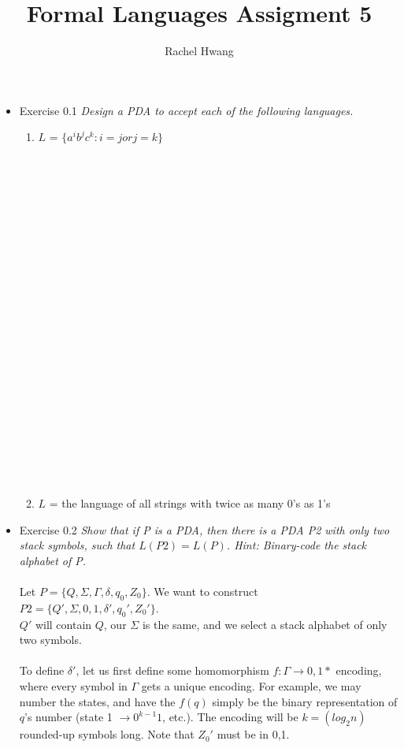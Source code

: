 \documentclass[a4paper]{article}
\title{Formal Languages Assigment 5}
\author{Rachel Hwang}
\begin{document}
\maketitle

\begin{itemize}
\item{Exercise 0.1}
\emph{Design a PDA to accept each of the following languages.}
\begin{enumerate}
\item $L$ = $\{a^ib^jc^k : i = j or j = k\}$
\\
\\
\\\\\\\\\\\\\\\\\\\\\\\\\\\\\\\\\\\\\\\\\\
\item $L$ = the language of all strings with twice as many 0's as 1's
\end{enumerate}
\newpage
\item{Exercise 0.2}
\emph{Show that if P is a PDA, then there is a PDA P2 with only two stack symbols, such that $L(P2) = L(P)$. Hint: Binary-code the stack alphabet of P.} \\
\\
Let $P = \{Q, \Sigma, \Gamma, \delta, q_0, Z_0\}$. We want to construct $P2 = \{Q', \Sigma, {0,1}, \delta', q_0', Z_0'\}$. \\
$Q'$ will contain $Q$, our $\Sigma$ is the same, and we select a stack alphabet of only two symbols. \\
\\
To define $\delta'$, let us first define some homomorphism $f:\Gamma \to {0,1}*$ encoding, where every symbol in $\Gamma$ gets a unique encoding. For example, we may number the states, and have the $f(q)$ simply be the binary representation of $q$'s number (state 1 $\to 0^{k-1}1$, etc.). The encoding will be $k = (log_2 n)$ rounded-up symbols long. Note that $Z_0'$ must be in {0,1}.\\

\end{itemize}
\end{document}
